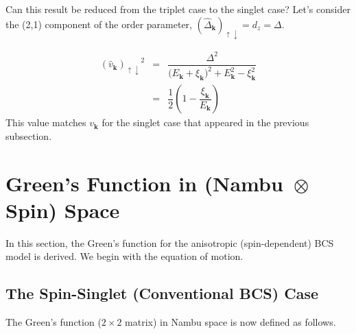 \documentclass[uplatex,a4j,12pt,dvipdfmx]{jsarticle}
\begin{document}
Can this result be reduced from the triplet case to the singlet case?
Let's consider the (2,1) component of the order parameter, $(\hat{\Delta}_{\bm{k}})_{\uparrow \downarrow} = d_{z} = \Delta$.

\begin{eqnarray}
	{(\hat{v}_{\bm{k}})_{\uparrow \downarrow}}^{2}
	&=&
	\dfrac{ \Delta^{2} }{ \big( E_{\bm{k}} + \xi_{\bm{k}} \big)^{2} + E_{\bm{k}}^{2} - \xi_{\bm{k}}^{2} }
	\nonumber \\[2mm] &=&
	\dfrac{1}{2}
	\left( 1 - \dfrac{\xi_{\bm{k}}}{E_{\bm{k}}} \right)
\end{eqnarray}
%
This value matches $v_{\bm{k}}$ for the singlet case that appeared in the previous subsection.

\section{Green's Function in (Nambu $\!\! \otimes \!\!$ Spin) Space}

In this section, the Green's function for the anisotropic (spin-dependent) BCS model is derived.
We begin with the equation of motion.


\subsection{The Spin-Singlet (Conventional BCS) Case}

The Green's function ($2 \times 2$ matrix) in Nambu space is now defined as follows.
\end{document}
